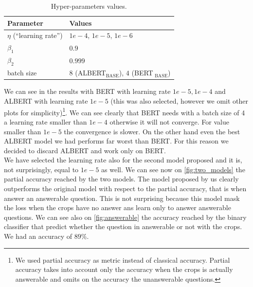\documentclass[10pt,hidelinks]{article}
\def\colOne{white}
\def\colTwo{pblue!10}
\def\colHea{pblue!35}
\begin{document}
\begin{table}[ht!]
	\footnotesize\centering
	\rowcolors{2}{\colOne}{\colTwo}
	\begin{tabular}{|l|p{60mm}|}
		\hline\rowcolor{\colHea} Parameter & Values\\\hline\hline
		$ \eta $ (``learning rate'') & $ 1e-4$, $1e-5$, $1e-6$ \\
		$\beta_1$ & $0.9$\\
		$\beta_2$ & $0.999$\\
		batch size & $8$ (ALBERT$_{\text{BASE}}$), $4$ (BERT$_{\text{ BASE}}$)\\
		\hline
		\end{tabular}
	\caption{Hyper-parameters values.}\label{tab:grid_search}
\end{table}

We can see in  the results with BERT with learning rate $1e-5, 1e-4$ and ALBERT with learning rate $1e-5$ (this was also selected, however we omit other plots for simplicity)\footnote{We used partial accuracy as metric instead of classical accuracy. Partial accuracy takes into account only the accuracy when the crops is actually answerable and omits on the accuracy the unanswerable questions. }. We can see clearly that BERT needs with a batch size of 4 a learning rate smaller than $1e-4$ otherwise it will not converge. For value smaller than $1e-5$ the convergence is slower. On the other hand even the best ALBERT model we had performs far worst than BERT. For this reason we decided to discard ALBERT and work only on BERT.\\
We have selected the learning rate also for the second model proposed and it is, not surprisingly, equal to $1e-5$ as well. We can see now on \cref{fig:two_models} the partial accuracy reached by the two models. The model proposed by us clearly outperforms the original model with respect to the partial accuracy, that is when answer an answerable question. This is not surprising because this model mask the loss when the crops have no answer ans learn only to answer answerable questions. We can see also on \cref{fig:answerable} the accuracy reached by the binary classifier that predict whether the question in answerable or not with the crops. We had an accuracy of $89\%$. 
\end{document}
